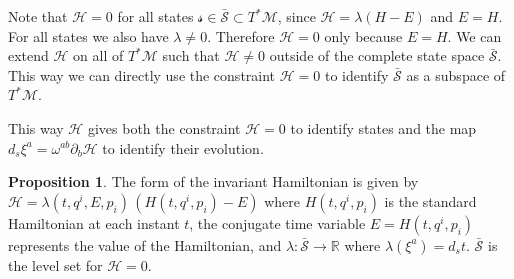 \documentclass[smallextended]{svjour3}
\numberwithin{equation}{section}
\theoremstyle{definition}
\newtheorem{prop}[equation]{Proposition}
\begin{document}
Note that $\mathcal{H}=0$ for all states $\mathcal{s} \in \bar{\mathcal{S}} \subset T^* \mathcal{M}$, since $\mathcal{H}=\lambda(H-E)$ and $E = H$. For all states we also have $\lambda \neq 0$. Therefore $\mathcal{H}=0$ only because $E = H$. We can extend $\mathcal{H}$ on all of $T^* \mathcal{M}$ such that $\mathcal{H} \neq 0$ outside of the complete state space $\bar{\mathcal{S}}$. This way we can directly use the constraint $\mathcal{H}=0$ to identify $\bar{\mathcal{S}}$ as a subspace of $T^* \mathcal{M}$.

This way $\mathcal{H}$ gives both the constraint $\mathcal{H}=0$ to identify states and the map $d_s \xi^a=\omega^{ab} \partial_b \mathcal{H}$ to identify their evolution.

\begin{prop}\label{prop:form_of_invariant_hamiltonian}
	The form of the invariant Hamiltonian is given by $\mathcal{H} = \lambda(t,q^i,E,p_i) \,  (H(t,q^i,p_i) - E)$ where $H(t,q^i,p_i)$ is the standard Hamiltonian at each instant $t$, the conjugate time variable $E = H(t,q^i,p_i)$ represents the value of the Hamiltonian, and  $\lambda : \bar{\mathcal{S}} \rightarrow \mathbb{R}$ where $\lambda(\xi^a) = d_s t$. $\bar{\mathcal{S}}$ is the level set for $\mathcal{H} = 0$.
\end{prop}
\end{document}
